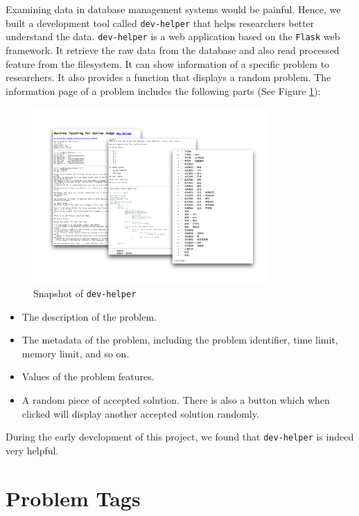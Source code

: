     Examining data in database management systems would be painful.
    Hence, we built a development tool called \texttt{dev-helper}
    that helps researchers better understand the data.
    \texttt{dev-helper} is a web application based on the \texttt{Flask}\cite{flask} web framework.
    It retrieve the raw data from the database and also read processed feature from the filesystem.
    It can show information of a specific problem to researchers.
    It also provides a function that displays a random problem.
    The information page of a problem includes the following parts (See Figure \ref{fig:dev-helper}):

    \begin{figure}[htp]
        \centering
        \includegraphics[width=0.8\textwidth]{img/dev-helper.pdf}
        \caption{Snapshot of \texttt{dev-helper}}
        \label{fig:dev-helper}
    \end{figure}

    \begin{itemize}
        \item The description of the problem.
        \item The metadata of the problem, including the problem identifier, time limit, memory limit, and so on.
        \item Values of the problem features.
        \item A random piece of accepted solution.
            There is also a button which when clicked will display another accepted solution randomly.
    \end{itemize}

    During the early development of this project, we found that \texttt{dev-helper} is indeed very helpful.

\section{Problem Tags}

